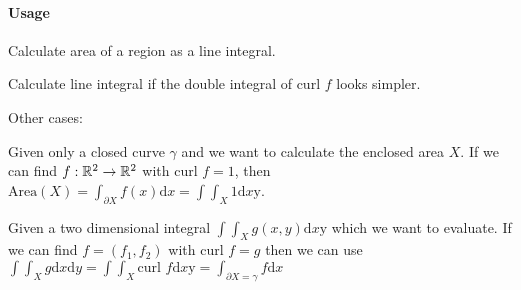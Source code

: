 \paragraph{Usage}
\begin{compactenum}
    \item Calculate area of a region as a line integral.
    \item Calculate line integral if the double integral of $\text{curl }f$ looks simpler.
\end{compactenum}

Other cases:
\begin{compactitem}
    \item Given only a closed curve $\gamma$ and we want to calculate the enclosed area $X$. If we can find $f: \mathbb{R}^2 \to \mathbb{R}^2$ with $\text{curl } f = 1$, then $\text{Area}(X) = \int_{\partial X} f(x) \mathrm{d}x = \int\int_X 1 \mathrm{d}x\mathrm{y}$.
    \item Given a two dimensional integral $\int\int_X g(x, y) \mathrm{d}x\mathrm{y}$ which we want to evaluate. If we can find $f = (f_1, f_2)$ with $\text{curl }f = g$ then we can use $\int\int_X g \mathrm{d}x\mathrm{d}y = \int\int_X \text{curl }f \mathrm{d}x\mathrm{y} = \int_{\partial X = \gamma} f \mathrm{d} x$
\end{compactitem}



